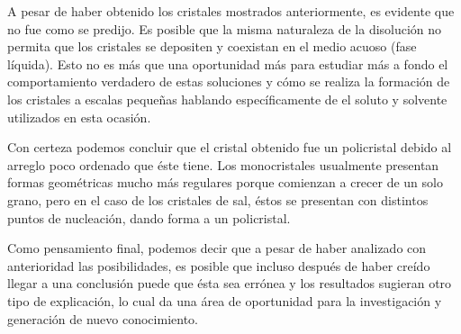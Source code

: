 \documentclass[letterpaper]{article}
\begin{document}
A pesar de haber obtenido los cristales mostrados anteriormente, es evidente que no fue como se predijo. Es posible que la misma naturaleza de la disolución no permita que los cristales se depositen y coexistan en el medio acuoso (fase líquida). Esto no es más que una oportunidad más para estudiar más a fondo el comportamiento verdadero de estas soluciones y cómo se realiza la formación de los cristales a escalas pequeñas hablando específicamente de el soluto y solvente utilizados en esta ocasión.

Con certeza podemos concluir que el cristal obtenido fue un policristal debido al arreglo poco ordenado que éste tiene. Los monocristales usualmente presentan formas geométricas mucho más regulares porque comienzan a crecer de un solo grano, pero en el caso de los cristales de sal, éstos se presentan con distintos puntos de nucleación, dando forma a un policristal.

Como pensamiento final, podemos decir que a pesar de haber analizado con anterioridad las posibilidades, es posible que incluso después de haber creído llegar a una conclusión puede que ésta sea errónea y los resultados sugieran otro tipo de explicación, lo cual da una área de oportunidad para la investigación y generación de nuevo conocimiento.
\renewcommand\refname{Referencias}
\printbibliography
\end{document}
